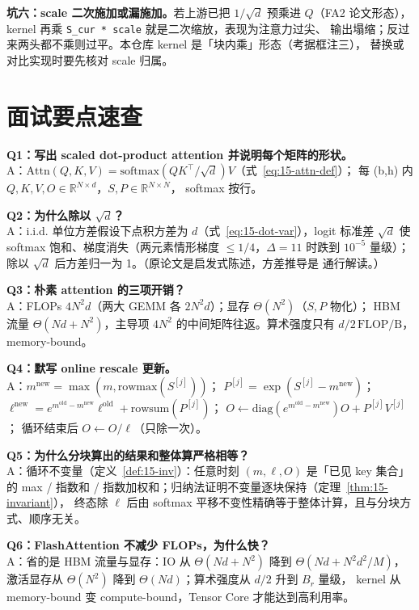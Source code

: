\textbf{坑六：scale 二次施加或漏施加。}若上游已把 $1/\sqrt{d}$ 预乘进 $Q$（FA2
论文形态），kernel 再乘 \texttt{S\_cur * scale} 就是二次缩放，表现为注意力过尖、
输出塌缩；反过来两头都不乘则过平。本仓库 kernel 是「块内乘」形态（考据框注三），
替换或对比实现时要先核对 scale 归属。

\section{面试要点速查}

\textbf{Q1：写出 scaled dot-product attention 并说明每个矩阵的形状。}\\
A：$\mathrm{Attn}(Q,K,V) = \mathrm{softmax}(QK^{\top}/\sqrt{d})V$（式~\ref{eq:15-attn-def}）；
每 (b,h) 内 $Q, K, V, O \in \mathbb{R}^{N \times d}$，$S, P \in \mathbb{R}^{N \times N}$，
softmax 按行。

\textbf{Q2：为什么除以 $\sqrt d$？}\\
A：i.i.d. 单位方差假设下点积方差为 $d$（式~\ref{eq:15-dot-var}），logit 标准差
$\sqrt d$ 使 softmax 饱和、梯度消失（两元素情形梯度 $\le 1/4$，$\Delta{=}11$ 时跌到
$10^{-5}$ 量级）；除以 $\sqrt d$ 后方差归一为 1。（原论文是启发式陈述，方差推导是
通行解读。）

\textbf{Q3：朴素 attention 的三项开销？}\\
A：FLOPs $4N^{2}d$（两大 GEMM 各 $2N^{2}d$）；显存 $\Theta(N^{2})$（$S, P$ 物化）；
HBM 流量 $\Theta(Nd + N^{2})$，主导项 $4N^{2}$ 的中间矩阵往返。算术强度只有
$d/2\,\mathrm{FLOP/B}$，memory-bound。

\textbf{Q4：默写 online rescale 更新。}\\
A：$m^{\mathrm{new}} = \max(m, \mathrm{rowmax}(S^{[j]}))$；
$P^{[j]} = \exp(S^{[j]} - m^{\mathrm{new}})$；
$\ell^{\mathrm{new}} = e^{m^{\mathrm{old}}-m^{\mathrm{new}}}\ell^{\mathrm{old}} +
\mathrm{rowsum}(P^{[j]})$；
$O \leftarrow \mathrm{diag}(e^{m^{\mathrm{old}}-m^{\mathrm{new}}})O + P^{[j]}V^{[j]}$；
循环结束后 $O \leftarrow O/\ell$（只除一次）。

\textbf{Q5：为什么分块算出的结果和整体算严格相等？}\\
A：循环不变量（定义~\ref{def:15-inv}）：任意时刻 $(m, \ell, O)$ 是「已见 key 集合」
的 max / 指数和 / 指数加权和；归纳法证明不变量逐块保持（定理~\ref{thm:15-invariant}），
终态除 $\ell$ 后由 softmax 平移不变性精确等于整体计算，且与分块方式、顺序无关。

\textbf{Q6：FlashAttention 不减少 FLOPs，为什么快？}\\
A：省的是 HBM 流量与显存：IO 从 $\Theta(Nd + N^{2})$ 降到 $\Theta(Nd + N^{2}d^{2}/M)$，
激活显存从 $\Theta(N^{2})$ 降到 $\Theta(Nd)$；算术强度从 $d/2$ 升到 $B_r$ 量级，
kernel 从 memory-bound 变 compute-bound，Tensor Core 才能达到高利用率。

